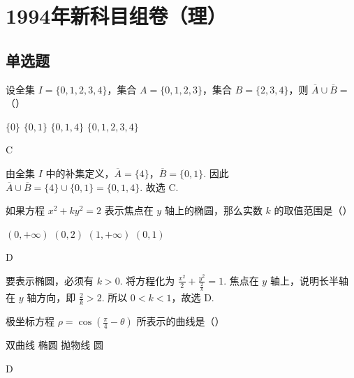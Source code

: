 \documentclass[UTF8,a4paper,oneside,11pt]{ctexbook}
\begin{document}
\mainmatter

\chapter{1994年新科目组卷（理）}
\section{单选题}

\begin{problem}
设全集 \(I = \{0, 1, 2, 3, 4\}\)，集合 \(A = \{0, 1, 2, 3\}\)，集合 \(B = \{2, 3, 4\}\)，则 \(\overline{A} \cup \overline{B} =\)（\quad）

\choices
    {\(\{0\}\)}
    {\(\{0,1\}\)}
    {\(\{0,1,4\}\)}
    {\(\{0,1,2,3,4\}\)}
\end{problem}

\begin{answer}
C
\end{answer}

\begin{solution}
由全集 \(I\) 中的补集定义，\(\overline{A}=\{4\}\)，\(\overline{B}=\{0,1\}\). 因此 \(\overline{A}\cup\overline{B}=\{4\}\cup\{0,1\}=\{0,1,4\}\).
故选 C.
\end{solution}

\begin{problem}
如果方程 \(x^{2} + ky^{2} = 2\) 表示焦点在 \(y\) 轴上的椭圆，那么实数 \(k\) 的取值范围是（\quad）

\choices
    {\((0, +\infty)\)}
    {\((0, 2)\)}
    {\((1, +\infty)\)}
    {\((0, 1)\)}
\end{problem}

\begin{answer}
D
\end{answer}

\begin{solution}
要表示椭圆，必须有 \(k>0\). 将方程化为 \(\frac{x^2}{2}+\frac{y^2}{\frac{2}{k}}=1\). 焦点在 \(y\) 轴上，说明长半轴在 \(y\) 轴方向，即 \(\frac{2}{k}>2\).
所以 \(0<k<1\)，故选 D.
\end{solution}

\begin{problem}
极坐标方程 \(\rho = \cos \left(\frac{\pi}{4} -\theta\right)\) 所表示的曲线是（\quad）

\choices
    {双曲线}
    {椭圆}
    {抛物线}
    {圆}
\end{problem}

\begin{answer}
D
\end{answer}
\end{document}
